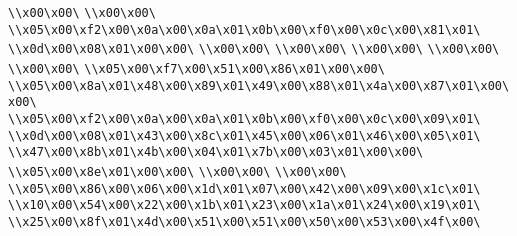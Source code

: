 \verb|\\x00\x00\|\newline
\verb|\\x00\x00\|\newline
\verb|\\x05\x00\xf2\x00\x0a\x00\x0a\x01\x0b\x00\xf0\x00\x0c\x00\x81\x01\|\newline
\verb|\\x0d\x00\x08\x01\x00\x00\|\newline
\verb|\\x00\x00\|\newline
\verb|\\x00\x00\|\newline
\verb|\\x00\x00\|\newline
\verb|\\x00\x00\|\newline
\verb|\\x00\x00\|\newline
\verb|\\x05\x00\xf7\x00\x51\x00\x86\x01\x00\x00\|\newline
\verb|\\x05\x00\x8a\x01\x48\x00\x89\x01\x49\x00\x88\x01\x4a\x00\x87\x01\x00\x00\|\newline
\verb|\\x05\x00\xf2\x00\x0a\x00\x0a\x01\x0b\x00\xf0\x00\x0c\x00\x09\x01\|\newline
\verb|\\x0d\x00\x08\x01\x43\x00\x8c\x01\x45\x00\x06\x01\x46\x00\x05\x01\|\newline
\verb|\\x47\x00\x8b\x01\x4b\x00\x04\x01\x7b\x00\x03\x01\x00\x00\|\newline
\verb|\\x05\x00\x8e\x01\x00\x00\|\newline
\verb|\\x00\x00\|\newline
\verb|\\x00\x00\|\newline
\verb|\\x05\x00\x86\x00\x06\x00\x1d\x01\x07\x00\x42\x00\x09\x00\x1c\x01\|\newline
\verb|\\x10\x00\x54\x00\x22\x00\x1b\x01\x23\x00\x1a\x01\x24\x00\x19\x01\|\newline
\verb|\\x25\x00\x8f\x01\x4d\x00\x51\x00\x51\x00\x50\x00\x53\x00\x4f\x00\|\newline
